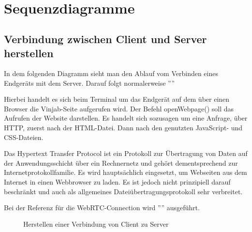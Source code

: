 \documentclass[entwurf.tex]{subfiles}
\begin{document}
\chapter{Sequenzdiagramme}
	\section{Verbindung zwischen Client und Server herstellen}
	\label{Sequence:TerminalConnect}
		In dem folgenden Diagramm sieht man den Ablauf vom Verbinden eines Endgeräts mit dem Server. Darauf folgt normalerweise ''''
		
		Hierbei handelt es sich beim Terminal um das Endgerät auf dem über einen Browser die Vinjab-Seite aufgerufen wird. Der Befehl openWebpage() soll das Aufrufen der Website darstellen. Es handelt sich sozusagen um eine Anfrage, über HTTP, zuerst nach der HTML-Datei. Dann nach den genutzten JavaScript- und CSS-Dateien.

		Das Hypertext Transfer Protocol ist ein Protokoll zur Übertragung von Daten auf der Anwendungsschicht über ein Rechnernetz und gehört dementsprechend zur Internetprotokollfamilie. Es wird hauptsächlich eingesetzt, um Webseiten aus dem Internet in einen Webbrowser zu laden. Es ist jedoch nicht prinzipiell darauf beschränkt und auch als allgemeines Dateiübertragungsprotokoll sehr verbreitet.
		
		Bei der Referenz für die WebRTC-Connection wird '''' ausgeführt.
		
		\begin{figure}[H]
  			\caption{Herstellen einer Verbindung von Client zu Server}
  		\end{figure}
  		
\end{document}
